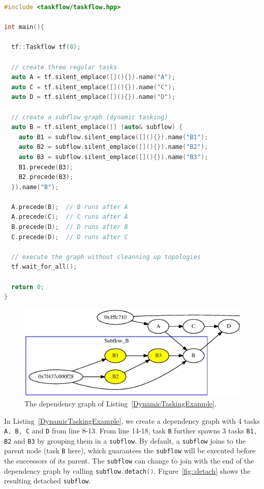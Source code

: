 \documentclass[sigconf]{acmart}
\def\codeinline{\lstinline[basicstyle=\normalsize\color{darkgray},language=C++]}
\begin{document}
\begin{lstlisting}[language=C++,label=DynamicTaskingExample,caption={A dynamic tasking example.}]
#include <taskflow/taskflow.hpp>  

int main(){

  tf::Taskflow tf(8);  

  // create three regular tasks
  auto A = tf.silent_emplace([](){}).name("A");
  auto C = tf.silent_emplace([](){}).name("C");
  auto D = tf.silent_emplace([](){}).name("D");
  
  // create a subflow graph (dynamic tasking)
  auto B = tf.silent_emplace([] (auto& subflow) {
    auto B1 = subflow.silent_emplace([](){}).name("B1");
    auto B2 = subflow.silent_emplace([](){}).name("B2");
    auto B3 = subflow.silent_emplace([](){}).name("B3");
    B1.precede(B3);
    B2.precede(B3);
  }).name("B");
              
  A.precede(B);  // B runs after A 
  A.precede(C);  // C runs after A 
  B.precede(D);  // D runs after B 
  C.precede(D);  // D runs after C 
  
  // execute the graph without cleanning up topologies
  tf.wait_for_all();

  return 0;
}
\end{lstlisting} 

\begin{figure}[htb]
 \centering
 \includegraphics[width=1.0\columnwidth]{Fig/dynamic.eps}
  \caption{
    The dependency graph of Listing~\ref{DynamicTaskingExample}.
  }
 \label{fig::dynamic}
\end{figure}

In Listing~\ref{DynamicTaskingExample}, we create a dependency graph with 4
tasks \codeinline{A, B, C} and \codeinline{D} from line 8-13. From line 14-18,
task \codeinline{B} further spawns 3 tasks \codeinline{B1, B2} and
\codeinline{B3} by grouping them in a \codeinline{subflow}. By default, a
\codeinline{subflow} joins to the parent node (task \codeinline{B} here), which 
guarantees the \codeinline{subflow} will be executed before the successors of its parent.
The \codeinline{subflow} can change to join with the end of the dependency
graph by calling \codeinline{subflow.detach()}. Figure~\ref{fig::detach} shows the resulting 
detached \codeinline{subflow}.
\end{document}
